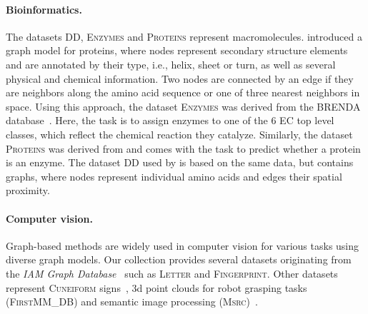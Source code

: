 \documentclass{article}
\theoremstyle{definition}
\begin{document}
\paragraph{Bioinformatics.}
The datasets \textsc{DD}, \textsc{Enzymes} and \textsc{Proteins} represent macromolecules. \citet{Bor+2005a} introduced a graph model for proteins, where nodes represent secondary structure elements and are annotated by their type, i.e., helix, sheet or turn, as well as several physical and chemical information. Two nodes are connected by an edge if they are neighbors along the amino acid sequence or one of three nearest neighbors in space. Using this approach, the dataset \textsc{Enzymes} was derived from the BRENDA database~\citep{Schomburg2004}. Here, the task is to assign enzymes to one of the 6 EC top level classes, which reflect the chemical reaction they catalyze. Similarly, the dataset \textsc{Proteins} was derived from \citep{Dob+2003} and comes with the task to predict whether a protein is an enzyme. The dataset \textsc{DD} used by \citet{She+2011} is based on the same data, but contains graphs, where nodes represent individual amino acids and edges their spatial proximity.


\paragraph{Computer vision.}
Graph-based methods are widely used in computer vision for various tasks using diverse graph models. Our collection provides several datasets originating from the \emph{IAM Graph Database}~\citep{Riesen2008} such as \textsc{Letter} and \textsc{Fingerprint}. Other datasets represent \textsc{Cuneiform} signs~\citep{Kriege2018}, 3d point clouds for robot grasping tasks (\textsc{FirstMM\_DB}) and semantic image processing (\textsc{Msrc})~\citep{Neu+2016}.
\end{document}
